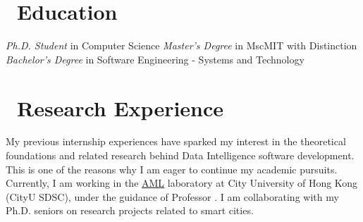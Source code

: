 \documentclass{resume}
\begin{document}



\section{\faGraduationCap\ {Education}}
\textit{Ph.D. Student} in Computer Science
\textit{Master's Degree} in MscMIT with Distinction
\textit{Bachelor's Degree} in Software Engineering - Systems and Technology


\section{\faUsers\ Research Experience}

My previous internship experiences have sparked my interest in the theoretical foundations and related research behind Data Intelligence software development. This is one of the reasons why I am eager to continue my academic pursuits. Currently, I am working in the \href{[https://aml-cityu.github.io/team/ ↗](https://aml-cityu.github.io/team/)}{AML} laboratory at City University of Hong Kong (CityU SDSC), under the guidance of Professor \href{[https://www.cityu.edu.hk/stfprofile/xyzhao.htm ↗](https://www.cityu.edu.hk/stfprofile/xyzhao.htm)}{\color{blue}{Xiangyu Zhao}}. I am collaborating with my Ph.D. seniors on research projects related to smart cities.

\href{https://github.com/VAN-QIAN/CIKM23-HIEST}{\color{blue}{Project Link}}\\
\end{document}
